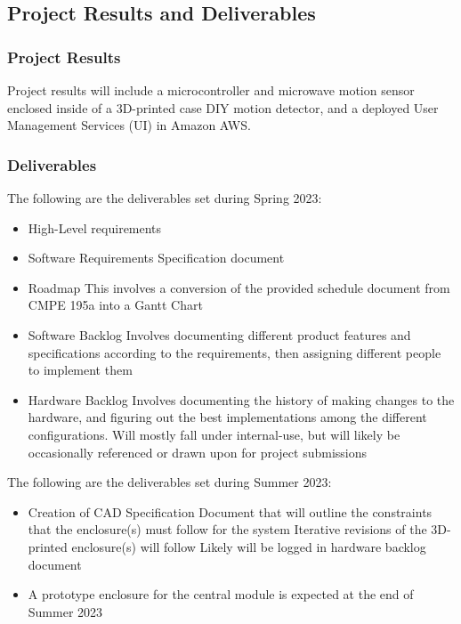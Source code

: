 \documentclass[conference]{IEEEtran}
\begin{document}
\subsection{Project Results and Deliverables}

\subsubsection{Project Results}

Project results will include a microcontroller and microwave motion sensor enclosed inside
of a 3D-printed case DIY motion detector, and a deployed User Management Services (UI)
in Amazon AWS.

\subsubsection{Deliverables}

The following are the deliverables set during Spring 2023:
\begin{itemize}
      \item High-Level requirements
      \item Software Requirements Specification document
      \item Roadmap
            \subitem This involves a conversion of the provided schedule document from
            CMPE 195a into a Gantt Chart
      \item Software Backlog
            \subitem Involves documenting different product features and specifications
            according to the requirements, then assigning different people to implement them
      \item Hardware Backlog
            \subitem Involves documenting the history of making changes to the hardware,
            and figuring out the best implementations among the different configurations.
            \subitem Will mostly fall under internal-use, but will likely be occasionally
            referenced or drawn upon for project submissions
\end{itemize}

The following are the deliverables set during Summer 2023:
\begin{itemize}
      \item Creation of CAD Specification Document that will outline the
            constraints that the enclosure(s) must follow for the system
            \subitem Iterative revisions of the 3D-printed enclosure(s) will follow
            \subsubitem Likely will be logged in hardware backlog document
      \item A prototype enclosure for the central module is expected at the end of Summer 2023
\end{itemize}
\end{document}
